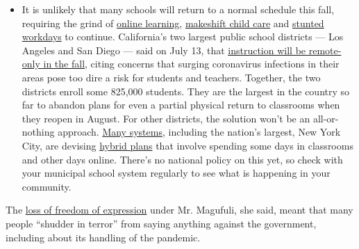 \begin{itemize}
  \begin{itemize}
  \tightlist
  \item
    It is unlikely that many schools will return to a normal schedule
    this fall, requiring the grind of
    \href{https://www.nytimes.com/2020/06/05/us/coronavirus-education-lost-learning.html?action=click\&pgtype=Article\&state=default\&region=MAIN_CONTENT_3\&context=storylines_faq}{online
    learning},
    \href{https://www.nytimes.com/2020/05/29/us/coronavirus-child-care-centers.html?action=click\&pgtype=Article\&state=default\&region=MAIN_CONTENT_3\&context=storylines_faq}{makeshift
    child care} and
    \href{https://www.nytimes.com/2020/06/03/business/economy/coronavirus-working-women.html?action=click\&pgtype=Article\&state=default\&region=MAIN_CONTENT_3\&context=storylines_faq}{stunted
    workdays} to continue. California's two largest public school
    districts --- Los Angeles and San Diego --- said on July 13, that
    \href{https://www.nytimes.com/2020/07/13/us/lausd-san-diego-school-reopening.html?action=click\&pgtype=Article\&state=default\&region=MAIN_CONTENT_3\&context=storylines_faq}{instruction
    will be remote-only in the fall}, citing concerns that surging
    coronavirus infections in their areas pose too dire a risk for
    students and teachers. Together, the two districts enroll some
    825,000 students. They are the largest in the country so far to
    abandon plans for even a partial physical return to classrooms when
    they reopen in August. For other districts, the solution won't be an
    all-or-nothing approach.
    \href{https://bioethics.jhu.edu/research-and-outreach/projects/eschool-initiative/school-policy-tracker/}{Many
    systems}, including the nation's largest, New York City, are
    devising
    \href{https://www.nytimes.com/2020/06/26/us/coronavirus-schools-reopen-fall.html?action=click\&pgtype=Article\&state=default\&region=MAIN_CONTENT_3\&context=storylines_faq}{hybrid
    plans} that involve spending some days in classrooms and other days
    online. There's no national policy on this yet, so check with your
    municipal school system regularly to see what is happening in your
    community.
  \end{itemize}
\end{itemize}

The
\href{https://www.article19.org/reader/global-expression-report-2018-19/regional-overviews/africa-regional-overview/africa-countries-in-focus/country-in-focus-tanzania/\#_ftnref2}{loss
of freedom of expression} under Mr. Magufuli, she said, meant that many
people ``shudder in terror'' from saying anything against the
government, including about its handling of the pandemic.

